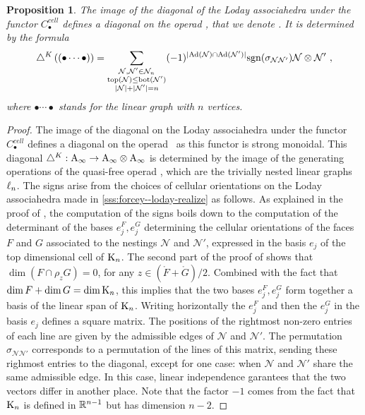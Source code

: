 \documentclass[twoside, 12pt]{amsart}
\newtheorem{proposition}[definition]{Proposition}
\theoremstyle{remark}
\begin{document}
\begin{proposition}
\label{prop:diagonal-polytopale-a-infini}
The image of the diagonal of the Loday associahedra under the functor $C_\bullet^{cell}$ defines a diagonal on the operad \Ainf , that we denote \diagainf . It is determined by the formula 
\[ \triangle^{K} \left( (\bullet \cdots \bullet) \right) = 
\sum_{\substack{
  \mathcal{N},\mathcal{N}' \in \mathcal{N}_n \\ 
  \operatorname{top}(\mathcal{N}) \leq \operatorname{bot}(\mathcal{N'}) \\
  |\mathcal{N}|+|\mathcal{N}'|=n
}}
(-1)^{|\mathrm{Ad}(\mathcal{N})\cap \mathrm{Ad}(\mathcal{N}')|}\mathrm{sgn}(\sigma_{\mathcal{N}\mathcal{N}'})\mathcal{N} \otimes \mathcal{N}' \ , \] 
where $\bullet \cdots \bullet$ stands for the linear graph with $n$ vertices. 
\end{proposition}

\begin{proof}
The image of the diagonal on the Loday associahedra under the functor $C_\bullet^{cell}$ defines a diagonal on the operad \Ainf\ as this functor is strong monoidal. 
This diagonal $\triangle^{K} : \mathrm{A}_\infty \rightarrow \mathrm{A}_\infty \otimes \mathrm{A}_\infty$ is determined by the image of the generating operations of the quasi-free operad \Ainf , which are the trivially nested linear graphs $\ell_n$. 
The signs arise from the choices of cellular orientations on the Loday associahedra made in \cref{sss:forcey--loday-realize} as follows. 
As explained in the proof of \cite[Proposition 4.27]{LA21}, the computation of the signs boils down to the computation of the determinant of the bases $e_j^{F}, e_j^{G}$ determining the cellular orientations of the faces $F$ and $G$ associated to the nestings $\mathcal{N}$ and $\mathcal{N}'$, expressed in the basis $e_j$ of the top dimensional cell of $\mathrm{K}_n$. 
The second part of the proof of \cite[Theorem 1.26]{LA21} shows that  $\dim(F\cap \rho_z G)=0$, for any $z \in (\mathring F+ \mathring G)/2$.
Combined with the fact that $\dim F + \dim G = \dim \mathrm{K}_n$, this implies that the two bases $e_j^F, e_j^G$ form together a basis of the linear span of $\mathrm{K}_n$. 
Writing horizontally the $e_j^F$ and then the $e_j^G$ in the basis $e_j$ defines a square matrix.
The positions of the rightmost non-zero entries of each line are given by the admissible edges of $\mathcal{N}$ and $\mathcal{N}'$. 
The permutation $\sigma_{\mathcal{N}\mathcal{N}'}$ corresponds to a permutation of the lines of this matrix, sending these righmost entries to the diagonal, except for one case: when $\mathcal{N}$ and $\mathcal{N}'$ share the same admissible edge. 
In this case, linear independence garantees that the two vectors differ in another place.
Note that the factor $-1$ comes from the fact that $\mathrm{K}_n$ is defined in $\mathbb{R}^{n-1}$ but has dimension $n-2$. 
\end{proof}
\end{document}
